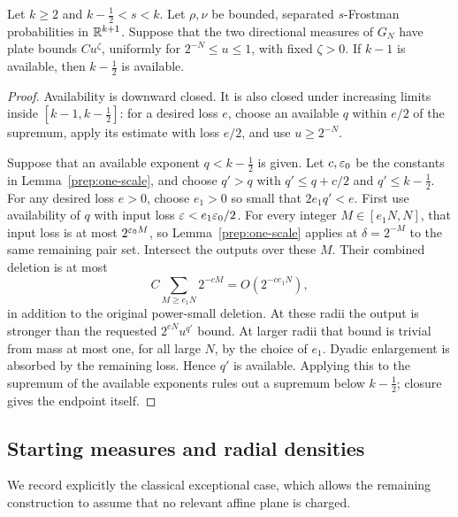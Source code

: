 \begin{proposition}\label{prep:thin-upgrade}
Let $k\ge2$ and $k-\tfrac12<s<k$. Let $\rho,\nu$ be bounded,
separated $s$-Frostman probabilities in $\mathbb R^{k+1}$. Suppose that the
two directional measures of $G_N$ have plate bounds $Cu^\zeta$,
uniformly for $2^{-N}\le u\le1$, with fixed $\zeta>0$.
If $k-1$ is available, then $k-\tfrac12$ is available.
\end{proposition}
\begin{proof}
Availability is downward closed. It is also closed under increasing
limits inside $[k-1,k-\tfrac12]$: for a desired loss $e$, choose an
available $q$ within $e/2$ of the supremum, apply its estimate with
loss $e/2$, and use $u\ge2^{-N}$.

Suppose that an available exponent $q<k-\tfrac12$ is given. Let
$c,\varepsilon_0$ be the constants in Lemma~\ref{prep:one-scale}, and choose
$q'>q$ with $q'\le q+c/2$ and $q'\le k-\tfrac12$. For any desired
loss $e>0$, choose $e_1>0$ so small that $2e_1q'<e$.
First use availability of $q$ with input loss
$\varepsilon<e_1\varepsilon_0/2$. For every integer $M\in[e_1N,N]$, that
input loss is at most $2^{\varepsilon_0M}$, so
Lemma~\ref{prep:one-scale} applies at $\delta=2^{-M}$ to the same
remaining pair set. Intersect the outputs over these $M$.
Their combined deletion is at most
\[
 C\sum_{M\ge e_1N}2^{-cM}=O(2^{-ce_1N}),
\]
in addition to the original power-small deletion. At these radii the
output is stronger than the requested $2^{eN}u^{q'}$ bound. At
larger radii that bound is trivial from mass at most one, for all large
$N$, by the choice of $e_1$. Dyadic enlargement is absorbed by the
remaining loss. Hence $q'$ is available. Applying this to the
supremum of the available exponents rules out a supremum below
$k-\tfrac12$; closure gives the endpoint itself.
\end{proof}

\subsection{Starting measures and radial densities}

We record explicitly the classical exceptional case, which allows the
remaining construction to assume that no relevant affine plane is charged.


